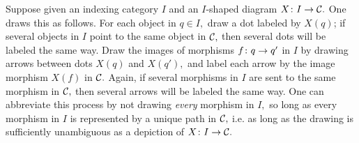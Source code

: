 \documentclass[CT4S-EN-RU]{subfiles}
\begin{document}
\begin{definitionRUS}
\end{definitionRUS}

\begin{blockENG}
Suppose given an indexing category $I$ and an $I$-shaped diagram $X\colon I\rightarrow\mathcal{C}.$ One draws this as follows. For each object in $q\in I,$ draw a dot labeled by $X(q)$; if several objects in $I$ point to the same object in $\mathcal{C},$ then several dots will be labeled the same way. Draw the images of morphisms $f\colon q\rightarrow q'$ in $I$ by drawing arrows between dots $X(q)$ and $X(q'),$ and label each arrow by the image morphism $X(f)$ in $\mathcal{C}.$ Again, if several morphisms in $I$ are sent to the same morphism in $\mathcal{C},$ then several arrows will be labeled the same way. One can abbreviate this process by not drawing {\em every} morphism in $I,$ so long as every morphism in $I$ is represented by a unique path in $\mathcal{C},$ i.e. as long as the drawing is sufficiently unambiguous as a depiction of $X\colon I\rightarrow\mathcal{C}.$
\end{blockENG}

\begin{blockRUS}
\end{blockRUS}
\end{document}
